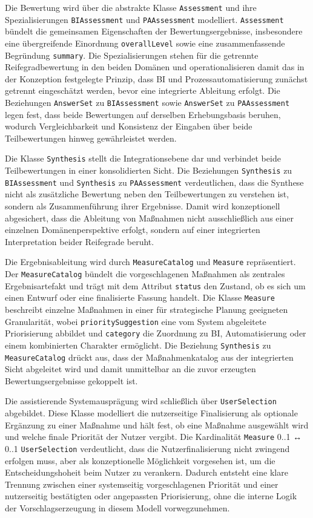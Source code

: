 Die Bewertung wird über die abstrakte Klasse \texttt{Assessment} und ihre Spezialisierungen \texttt{BIAssessment} und \texttt{PAAssessment} modelliert. \texttt{Assessment} bündelt die gemeinsamen Eigenschaften der Bewertungsergebnisse, insbesondere eine übergreifende Einordnung \texttt{overallLevel} sowie eine zusammenfassende Begründung \texttt{summary}. Die Spezialisierungen stehen für die getrennte Reifegradbewertung in den beiden Domänen und operationalisieren damit das in der Konzeption festgelegte Prinzip, dass BI und Prozessautomatisierung zunächst getrennt eingeschätzt werden, bevor eine integrierte Ableitung erfolgt. Die Beziehungen \texttt{AnswerSet} zu \texttt{BIAssessment} sowie \texttt{AnswerSet} zu \texttt{PAAssessment} legen fest, dass beide Bewertungen auf derselben Erhebungsbasis beruhen, wodurch Vergleichbarkeit und Konsistenz der Eingaben über beide Teilbewertungen hinweg gewährleistet werden.

Die Klasse \texttt{Synthesis} stellt die Integrationsebene dar und verbindet beide Teilbewertungen in einer konsolidierten Sicht. Die Beziehungen \texttt{Synthesis} zu \texttt{BIAssessment} und \texttt{Synthesis} zu \texttt{PAAssessment} verdeutlichen, dass die Synthese nicht als zusätzliche Bewertung neben den Teilbewertungen zu verstehen ist, sondern als Zusammenführung ihrer Ergebnisse. Damit wird konzeptionell abgesichert, dass die Ableitung von Maßnahmen nicht ausschließlich aus einer einzelnen Domänenperspektive erfolgt, sondern auf einer integrierten Interpretation beider Reifegrade beruht.

Die Ergebnisableitung wird durch \texttt{MeasureCatalog} und \texttt{Measure} repräsentiert. Der \texttt{MeasureCatalog} bündelt die vorgeschlagenen Maßnahmen als zentrales Ergebnisartefakt und trägt mit dem Attribut \texttt{status} den Zustand, ob es sich um einen Entwurf oder eine finalisierte Fassung handelt. Die Klasse \texttt{Measure} beschreibt einzelne Maßnahmen in einer für strategische Planung geeigneten Granularität, wobei \texttt{prioritySuggestion} eine vom System abgeleitete Priorisierung abbildet und \texttt{category} die Zuordnung zu BI, Automatisierung oder einem kombinierten Charakter ermöglicht. Die Beziehung \texttt{Synthesis} zu \texttt{MeasureCatalog} drückt aus, dass der Maßnahmenkatalog aus der integrierten Sicht abgeleitet wird und damit unmittelbar an die zuvor erzeugten Bewertungsergebnisse gekoppelt ist.

Die assistierende Systemausprägung wird schließlich über \texttt{UserSelection} abgebildet. Diese Klasse modelliert die nutzerseitige Finalisierung als optionale Ergänzung zu einer Maßnahme und hält fest, ob eine Maßnahme ausgewählt wird und welche finale Priorität der Nutzer vergibt. Die Kardinalität \texttt{Measure} 0..1 ↔ 0..1 \texttt{UserSelection} verdeutlicht, dass die Nutzerfinalisierung nicht zwingend erfolgen muss, aber als konzeptionelle Möglichkeit vorgesehen ist, um die Entscheidungshoheit beim Nutzer zu verankern. Dadurch entsteht eine klare Trennung zwischen einer systemseitig vorgeschlagenen Priorität und einer nutzerseitig bestätigten oder angepassten Priorisierung, ohne die interne Logik der Vorschlagserzeugung in diesem Modell vorwegzunehmen.


